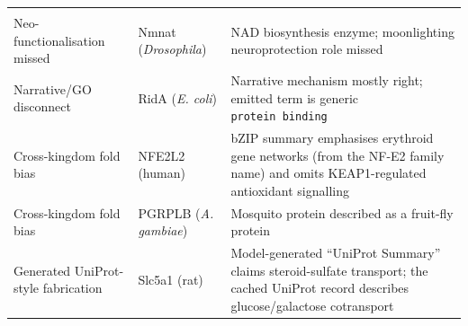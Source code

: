 \documentclass[
  11pt,
]{article}
\begin{document}
\begin{longtable}[]{@{}lll@{}}
\begin{minipage}[t]{0.30\columnwidth}
\end{minipage}\tabularnewline
\begin{minipage}[t]{0.30\columnwidth}\raggedright
Neo-functionalisation missed\strut
\end{minipage} & \begin{minipage}[t]{0.30\columnwidth}\raggedright
Nmnat (\emph{Drosophila})\strut
\end{minipage} & \begin{minipage}[t]{0.30\columnwidth}\raggedright
NAD biosynthesis enzyme; moonlighting neuroprotection role missed\strut
\end{minipage}\tabularnewline
\begin{minipage}[t]{0.30\columnwidth}\raggedright
Narrative/GO disconnect\strut
\end{minipage} & \begin{minipage}[t]{0.30\columnwidth}\raggedright
RidA (\emph{E. coli})\strut
\end{minipage} & \begin{minipage}[t]{0.30\columnwidth}\raggedright
Narrative mechanism mostly right; emitted term is generic
\texttt{protein\ binding}\strut
\end{minipage}\tabularnewline
\begin{minipage}[t]{0.30\columnwidth}\raggedright
Cross-kingdom fold bias\strut
\end{minipage} & \begin{minipage}[t]{0.30\columnwidth}\raggedright
NFE2L2 (human)\strut
\end{minipage} & \begin{minipage}[t]{0.30\columnwidth}\raggedright
bZIP summary emphasises erythroid gene networks (from the NF-E2 family
name) and omits KEAP1-regulated antioxidant signalling\strut
\end{minipage}\tabularnewline
\begin{minipage}[t]{0.30\columnwidth}\raggedright
Cross-kingdom fold bias\strut
\end{minipage} & \begin{minipage}[t]{0.30\columnwidth}\raggedright
PGRPLB (\emph{A. gambiae})\strut
\end{minipage} & \begin{minipage}[t]{0.30\columnwidth}\raggedright
Mosquito protein described as a fruit-fly protein\strut
\end{minipage}\tabularnewline
\begin{minipage}[t]{0.30\columnwidth}\raggedright
Generated UniProt-style fabrication\strut
\end{minipage} & \begin{minipage}[t]{0.30\columnwidth}\raggedright
Slc5a1 (rat)\strut
\end{minipage} & \begin{minipage}[t]{0.30\columnwidth}\raggedright
Model-generated ``UniProt Summary'' claims steroid-sulfate transport;
the cached UniProt record describes glucose/galactose cotransport\strut
\end{minipage}\tabularnewline
\bottomrule
\end{longtable}
\end{document}

